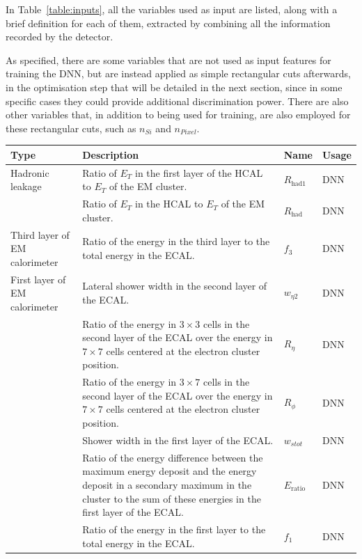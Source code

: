 In Table~\ref{table:inputs}, all the variables used as input are listed, along with a brief definition for each of them, extracted by combining all the information recorded by the detector.

As specified, there are some variables that are not used as input features for training the DNN, but are instead applied as simple rectangular cuts afterwards, in the optimisation step that will be detailed in the next section, since in some specific cases they could provide additional discrimination power. There are also other variables that, in addition to being used for training, are also employed for these rectangular cuts, such as $n_{Si}$ and $n_{Pixel}$.

{\scriptsize
\begin{longtable}{p{2.3cm}p{6.5cm}p{1.8cm}p{1.8cm}}
  \toprule
  \textbf{Type} & \textbf{Description} & \textbf{Name} & \textbf{Usage} \\
  \midrule
  \endfirsthead
  \midrule
  \endhead
  Hadronic leakage & Ratio of $E_T$ in the first layer of the HCAL to $E_T$ of the EM cluster. & $R_{\text{had1}}$ & DNN \\
   & Ratio of $E_T$ in the HCAL to $E_T$ of the EM cluster. & $R_{\text{had}}$ & DNN \\
  \midrule
  Third layer of EM calorimeter & Ratio of the energy in the third layer to the total energy in the ECAL. & $f_3$ & DNN \\
  \midrule
  First layer of EM calorimeter & Lateral shower width in the second layer of the ECAL. & $w_{\eta2}$ & DNN \\
 & Ratio of the energy in $3{\times}3$ cells in the second layer of the ECAL over the energy in $7{\times}7$ cells centered at the electron cluster position. & $R_{\eta}$ & DNN \\
 & Ratio of the energy in $3{\times}7$ cells in the second layer of the ECAL over the energy in $7{\times}7$ cells centered at the electron cluster position. & $R_{\phi}$ & DNN \\
 & Shower width in the first layer of the ECAL. & $w_{stot}$ & DNN\\
 & Ratio of the energy difference between the maximum energy deposit and the energy deposit in a secondary maximum in the cluster to the sum of these energies in the first layer of the ECAL. & $E_{\text{ratio}}$ & DNN \\
 & Ratio of the energy in the first layer to the total energy in the ECAL. & $f_1$ & DNN \\

\end{longtable}}
